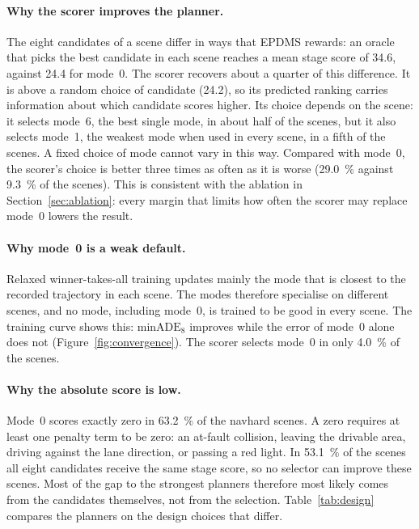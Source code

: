 \documentclass[11pt, a4paper, oneside]{book}
\begin{document}
\paragraph{Why the scorer improves the planner.} The eight candidates of a scene differ in ways
that EPDMS rewards: an oracle that picks the best candidate in each scene reaches a mean stage
score of \num{34.6}, against \num{24.4} for mode~0. The scorer recovers about a quarter of this
difference. It is above a random choice of candidate (\num{24.2}), so its predicted ranking carries
information about which candidate scores higher. Its choice depends on the scene: it selects mode~6,
the best single mode, in about half of the scenes, but it also selects mode~1, the weakest mode
when used in every scene, in a fifth of the scenes. A fixed choice of mode cannot vary in this
way. Compared with mode~0, the scorer's choice is better three times as often as it is worse
(\SI{29.0}{\percent} against \SI{9.3}{\percent} of the scenes). This is consistent with the
ablation in Section~\ref{sec:ablation}: every margin that limits how often the scorer may
replace mode~0 lowers the result.

\paragraph{Why mode~0 is a weak default.} Relaxed winner-takes-all training updates mainly the
mode that is closest to the recorded trajectory in each scene. The modes therefore specialise on
different scenes, and no mode, including mode~0, is trained to be good in every scene. The
training curve shows this: $\mathrm{minADE}_8$ improves while the error of mode~0 alone does
not (Figure~\ref{fig:convergence}). The scorer selects mode~0 in only \SI{4.0}{\percent} of the
scenes.

\paragraph{Why the absolute score is low.} Mode~0 scores exactly zero in \SI{63.2}{\percent} of
the navhard scenes. A zero requires at least one penalty term to be zero: an at-fault
collision, leaving the drivable area, driving against the lane direction, or passing a red
light. In \SI{53.1}{\percent} of the scenes all eight candidates receive the same stage score,
so no selector can improve these scenes. Most of the gap to the strongest planners therefore
most likely comes from the candidates themselves, not from the selection. Table~\ref{tab:design} compares
the planners on the design choices that differ.
\end{document}
